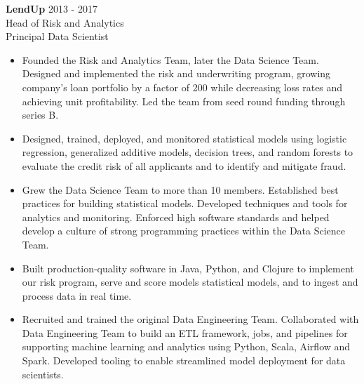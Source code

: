 \documentclass[9pt]{article}
\newenvironment{changemargin}[2]{%
  \begin{list}{}{%
    \setlength{\topsep}{0pt}%
    \setlength{\leftmargin}{#1}%
    \setlength{\rightmargin}{#2}%
    \setlength{\listparindent}{\parindent}%
    \setlength{\itemindent}{\parindent}%
    \setlength{\parsep}{\parskip}%
  }%
  \item[]}{\end{list}
}
\newenvironment{body} {
  \vspace*{-16pt}
\begin{changemargin}{-0.25in}{-0.5in}
  }
{\end{changemargin}
}
\begin{document}
\begin{body}

  \vspace{14pt}

  \textbf{LendUp} \hfill 2013 - 2017\\
  Head of Risk and Analytics \\
  Principal Data Scientist
  \begin{itemize}


    \item Founded the Risk and Analytics Team, later the Data Science Team.  Designed and implemented the risk and underwriting program, growing company's loan portfolio by a factor of 200 while decreasing loss rates and achieving unit profitability.  Led the team from seed round funding through series B. \\

    \item Designed, trained, deployed, and monitored statistical models using logistic regression, generalized additive models, decision trees, and random forests to evaluate the credit risk of all applicants and to identify and mitigate fraud. \\

    \item Grew the Data Science Team to more than 10 members. Established best practices for building statistical models.  Developed techniques and tools for analytics and monitoring.  Enforced high software standards and helped develop a culture of strong programming practices within the Data Science Team. \\

    \item Built production-quality software in Java, Python, and Clojure to implement our risk program, serve and score models statistical models, and to ingest and process data in real time. \\

    \item Recruited and trained the original Data Engineering Team.  Collaborated with Data Engineering Team to build an ETL framework, jobs, and pipelines for supporting machine learning and analytics using Python, Scala, Airflow and Spark.  Developed tooling to enable streamlined model deployment for data scientists. \\
  \end{itemize}


\end{body}
\end{document}
